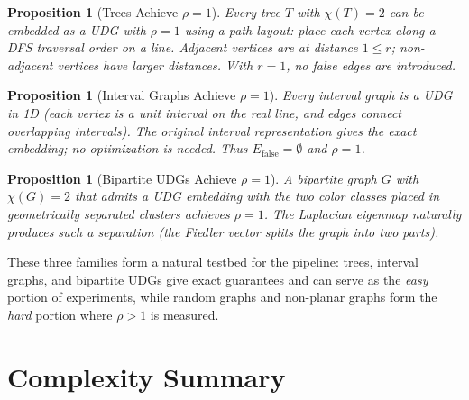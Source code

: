\documentclass[11pt]{article}
\newtheorem{proposition}[theorem]{Proposition}
\newcommand{\Efalse}{E_{\mathrm{false}}}
\begin{document}
\begin{proposition}[Trees Achieve $\rho = 1$]
Every tree $T$ with $\chi(T) = 2$ \cite{West2001} can be embedded as a UDG with $\rho = 1$ using
a path layout: place each vertex along a DFS traversal order on a line. Adjacent
vertices are at distance $1 \leq r$; non-adjacent vertices have larger distances.
With $r = 1$, no false edges are introduced.
\end{proposition}

\begin{proposition}[Interval Graphs Achieve $\rho = 1$]
Every interval graph \cite{Roberts1969, Golumbic1980} is a UDG in 1D (each vertex is a unit interval on the real
line, and edges connect overlapping intervals). The original interval
representation gives the exact embedding; no optimization is needed. Thus
$\Efalse = \emptyset$ and $\rho = 1$.
\end{proposition}

\begin{proposition}[Bipartite UDGs Achieve $\rho = 1$]
A bipartite graph $G$ with $\chi(G) = 2$ that admits a UDG embedding with the
two color classes placed in geometrically separated clusters achieves $\rho = 1$.
The Laplacian eigenmap naturally produces such a separation (the Fiedler vector
splits the graph into two parts).
\end{proposition}

These three families form a natural testbed for the pipeline: trees, interval
graphs, and bipartite UDGs give exact guarantees and can serve as the
\emph{easy} portion of experiments, while random graphs and non-planar graphs
form the \emph{hard} portion where $\rho > 1$ is measured.

\newpage

\section{Complexity Summary}
\end{document}
